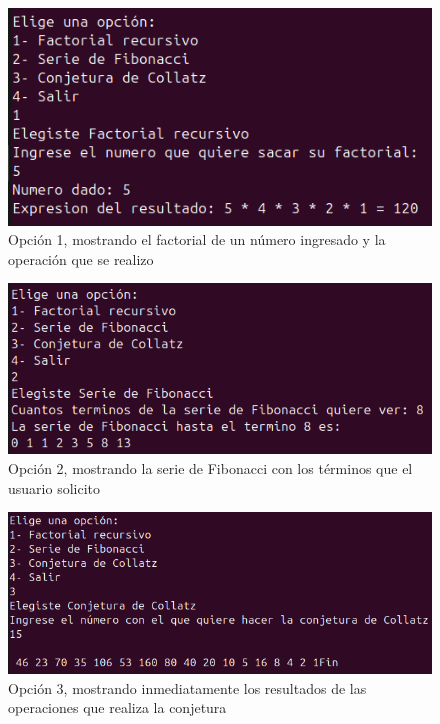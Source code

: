 \documentclass[letterpaper,12pt]{article}
\begin{document}
\begin{figure}[H]
    \centering
    \includegraphics[width=15cm]{Imagenes/Factorial.png}
    \caption{\centering Opción 1, mostrando el factorial de un número ingresado y la operación que se realizo}
\end{figure}

\begin{figure}[H]
    \centering
    \includegraphics[width=15cm]{Imagenes/Fibonacci.png}
    \caption{\centering Opción 2, mostrando la serie de Fibonacci con los términos que el usuario solicito}
\end{figure}

\begin{figure}[H]
    \centering
    \includegraphics[width=15cm]{Imagenes/Collatz.png}
    \caption{\centering Opción 3, mostrando inmediatamente los resultados de las operaciones que realiza la conjetura}
\end{figure}
\end{document}
